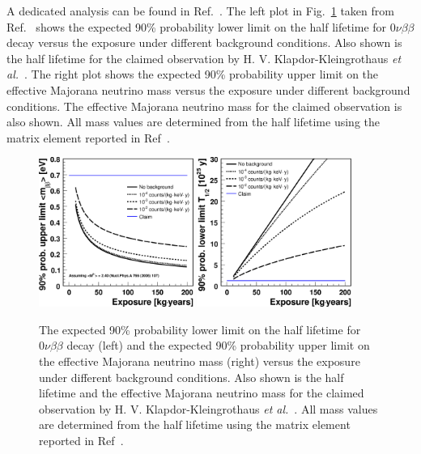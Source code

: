 A dedicated analysis can be found
in Ref.~\cite{Cal06}. The left plot in Fig.~\ref{fig:gerda:limit}
taken from Ref.~\cite{Cal06} shows the expected 90\% probability lower
limit on the half lifetime for $0\nu\beta\beta$ decay versus the
exposure under different background conditions. Also shown is the half
lifetime for the claimed observation by H. V. Klapdor-Kleingrothaus
\textit{et al.}~\cite{Hei04}. The right plot shows the expected 90\%
probability upper limit on the effective Majorana neutrino mass versus
the exposure under different background conditions. The effective
Majorana neutrino mass for the claimed observation is also shown. All
mass values are determined from the half lifetime using the matrix
element reported in Ref~\cite{Rod07}.
\begin{figure}[tbhp]
  \centering
  \includegraphics[width=0.45\textwidth]{limit_mass}  \hfil
  \includegraphics[width=0.45\textwidth]{limit_halflife}
  \caption{The expected 90\% probability lower limit on the half    
lifetime for $0\nu\beta\beta$ decay (left) and the expected 90\%    
probability upper limit on the effective Majorana neutrino mass    
(right) versus the exposure under different background conditions.    
Also shown is the half lifetime and the effective Majorana    
neutrino mass for the claimed observation by H. V.    
Klapdor-Kleingrothaus \textit{et al.}~\cite{Hei04}. All mass    
values are determined from the half lifetime using the matrix    
element reported in Ref~\cite{Rod07}.}
  \label{fig:gerda:limit}
\end{figure}

